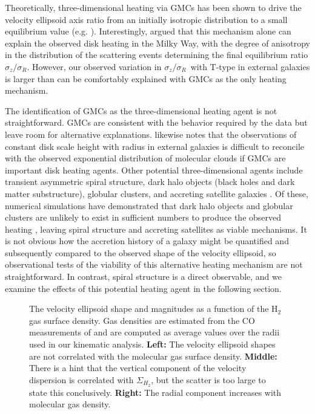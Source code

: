 \documentclass[useAMS,usenatbib]{mn2e}
\newcommand{\szsr}{$\sigma_z/\sigma_R$}
\begin{document}
Theoretically, three-dimensional heating via GMCs has been shown to
drive the velocity ellipsoid axis ratio from an initially isotropic
distribution to a small equilibrium value (e.g. \citealt{Jenkins1990}).
Interestingly, \citet{sellwood2008} argued that this mechanism
alone can explain the observed disk heating in the Milky Way, with the
degree of anisotropy in the distribution of the scattering events
determining the final equilibrium ratio \szsr.  However, our observed
variation in \szsr\ with T-type in external galaxies is larger than can
be comfortably explained with GMCs as the only heating mechanism.

The identification of GMCs as the three-dimensional heating agent is not
straightforward.  GMCs are consistent with the behavior required by the
data but leave room for alternative explanations.  \citet{Jenkins1992}
likewise notes that the observations of constant disk scale height with
radius in external galaxies is difficult to reconcile with the observed
exponential distribution of molecular clouds if GMCs are important disk
heating agents.  Other potential three-dimensional agents include
transient asymmetric spiral structure, dark halo objects (black holes
and dark matter substructure), globular clusters, and accreting
satellite galaxies
\citep{Saha2010,Lacey1985,Hanninen2002,vandePutte2009,Velazquez1999}.
Of these, numerical simulations have demonstrated that dark halo objects
and globular clusters are unlikely to exist in sufficient numbers to
produce the observed heating
\citep{Lacey1985,Hanninen2002,vandePutte2009, Benson2004}, leaving
spiral structure and accreting satellites as viable mechanisms.  It is
not obvious how the accretion history of a galaxy might be quantified
and subsequently compared to the observed shape of the velocity
ellipsoid, so observational tests of the viability of this alternative
heating mechanism are not straightforward.  In contrast, spiral
structure is a direct observable, and we examine the effects of this
potential heating agent in the following section.

\begin{figure}
    \centerline{}
   \caption{The velocity ellipsoid shape and magnitudes as a function of
     the H$_2$ gas surface density. Gas densities are estimated from the
     CO measurements of \citet{Young1995} and are computed as average
     values over the radii used in our kinematic analysis.  {\bf Left:}
     The velocity ellipsoid shapes are not correlated with the molecular
     gas surface density.  {\bf Middle:} There is a hint that the
     vertical component of the velocity dispersion is correlated with
     $\Sigma_{H_2}$, but the scatter is too large to state this
     conclusively. {\bf Right:} The radial component increases with
     molecular gas density.
   \label{f:fig7}}
\end{figure}
\end{document}
